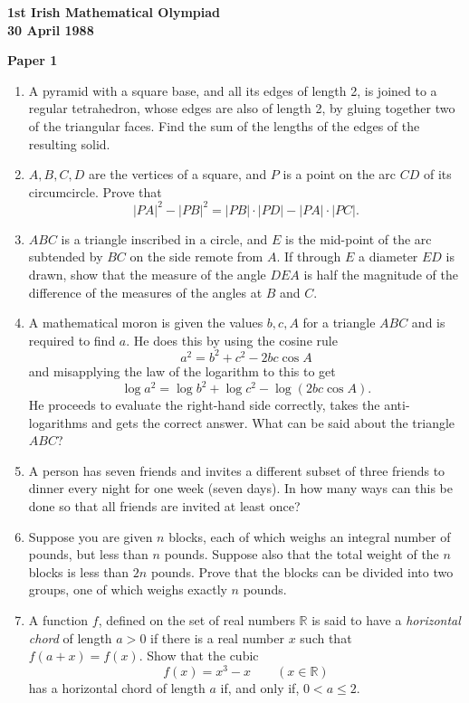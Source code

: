 \documentclass[12pt]{article}
\begin{document}
\begin{center}
{\large\bfseries 1st Irish Mathematical Olympiad\\
30 April 1988}
\end{center}

\bigskip
\noindent\textbf{Paper 1}
\bigskip

\begin{enumerate}
\item A pyramid with a square base, and all its edges of length 2, is joined to a regular tetrahedron, whose edges are also of length 2, by gluing together two of the triangular faces. Find the sum of the lengths of the edges of the resulting solid.

\item $A,B,C,D$ are the vertices of a square, and $P$ is a point on the arc $CD$ of its circumcircle. Prove that \[|PA|^2 - |PB|^2 = |PB|\cdot|PD| - |PA|\cdot|PC|.\]

\item $ABC$ is a triangle inscribed in a circle, and $E$ is the mid-point of the arc subtended by $BC$ on the side remote from $A$. If through $E$ a diameter $ED$ is drawn, show that the measure of the angle $DEA$ is half the magnitude of the difference of the measures of the angles at $B$ and $C$.

\item A mathematical moron is given the values $b, c, A$ for a triangle $ABC$ and is required to find $a$. He does this by using the cosine rule \[a^2 = b^2 + c^2 - 2bc\cos A\] and misapplying the law of the logarithm to this to get \[\log a^2 = \log b^2 + \log c^2 - \log(2bc\cos A).\] He proceeds to evaluate the right-hand side correctly, takes the anti-logarithms and gets the correct answer. What can be said about the triangle $ABC$?

\item A person has seven friends and invites a different subset of three friends to dinner every night for one week (seven days). In how many ways can this be done so that all friends are invited at least once?

\item Suppose you are given $n$ blocks, each of which weighs an integral number of pounds, but less than $n$ pounds. Suppose also that the total weight of the $n$ blocks is less than $2n$ pounds. Prove that the blocks can be divided into two groups, one of which weighs exactly $n$ pounds.

\item A function $f$, defined on the set of real numbers $\mathbb{R}$ is said to have a \emph{horizontal chord} of length $a > 0$ if there is a real number $x$ such that $f(a + x) = f(x)$. Show that the cubic \[f(x) = x^3 - x \qquad (x \in \mathbb{R})\] has a horizontal chord of length $a$ if, and only if, $0 < a \le 2$.


\end{enumerate}
\end{document}
